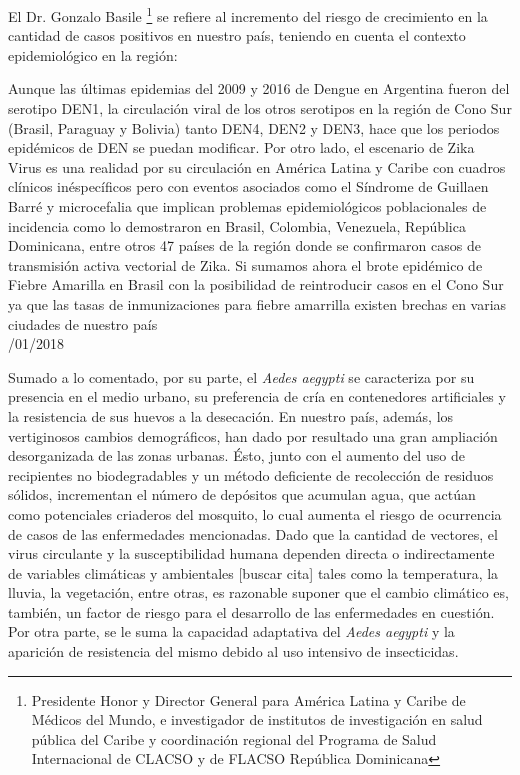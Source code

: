   \par El Dr. Gonzalo Basile \footnote{Presidente Honor y Director General para
                   América Latina y Caribe de Médicos del Mundo, e investigador de institutos de
                   investigación en salud pública del Caribe y coordinación regional del Programa
                   de Salud Internacional de CLACSO y de FLACSO República Dominicana}
       se refiere al incremento del riesgo de crecimiento
       en la cantidad de casos positivos en nuestro país, teniendo en cuenta
       el contexto epidemiológico en la región:
    \begin{framed}

      Aunque las últimas epidemias del 2009 y 2016 de Dengue en Argentina fueron del
      serotipo DEN1, la circulación viral de los otros serotipos en la región de
      Cono Sur (Brasil, Paraguay y Bolivia) tanto DEN4, DEN2 y DEN3, hace que los
      periodos epidémicos de DEN se puedan modificar. Por otro lado, el escenario de
      Zika Virus es una realidad por su circulación en América Latina y Caribe con
      cuadros clínicos inéspecíficos pero con eventos asociados como el Síndrome de
      Guillaen Barré y microcefalia que implican problemas epidemiológicos
      poblacionales de incidencia como lo demostraron en Brasil, Colombia, Venezuela,
      República Dominicana, entre otros 47 países de la región donde se confirmaron
      casos de transmisión activa vectorial de Zika.
      Si sumamos ahora el brote epidémico de Fiebre Amarilla en Brasil con la
      posibilidad de reintroducir casos en el Cono Sur ya que las tasas de
      inmunizaciones para fiebre amarrilla existen brechas en varias ciudades de nuestro país \\

     /01/2018
    \end{framed}



  \par Sumado a lo comentado, por su parte, el \textit{Aedes aegypti} se
    caracteriza por su presencia en el medio urbano, su preferencia
    de cría en contenedores artificiales \cite{cont_artificiales} y la
    resistencia de sus huevos a la
    desecación. En nuestro país, además, los vertiginosos cambios demográficos, han dado
    por resultado una gran ampliación desorganizada de las zonas urbanas. Ésto, junto
    con el aumento del uso de recipientes no biodegradables y un método deficiente
    de recolección de residuos sólidos, incrementan el número de depósitos que
    acumulan agua, que actúan como potenciales criaderos del mosquito, lo cual aumenta el
    riesgo de ocurrencia de casos de las enfermedades mencionadas.
    Dado que la cantidad de vectores, el virus circulante y la susceptibilidad
    humana dependen directa o indirectamente de variables climáticas y ambientales [buscar cita]
    tales como la temperatura, la lluvia, la vegetación, entre otras, es razonable
    suponer que el cambio climático es, también, un factor de riesgo para el desarrollo
    de las enfermedades en cuestión. Por otra parte, se le suma la capacidad adaptativa del
    \textit{Aedes aegypti} y la aparición de resistencia del mismo debido al uso intensivo de
    insecticidas.

